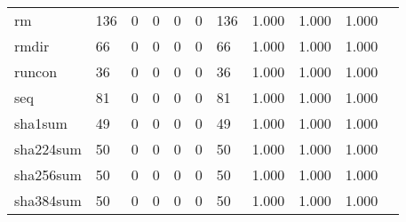 \begin{longtable}{lp{1.10cm}p{1.10cm}p{1.10cm}p{1.10cm}p{1.10cm}p{1.10cm}p{1.10cm}p{1.10cm}p{1.10cm}p{1.10cm}}
rm        &                    136 &                                  0 &                                 0 &                                0 &                                 0 &                             136 &                          1.000 &                                 1.000 &                               1.000 \\
rmdir     &                     66 &                                  0 &                                 0 &                                0 &                                 0 &                              66 &                          1.000 &                                 1.000 &                               1.000 \\
runcon    &                     36 &                                  0 &                                 0 &                                0 &                                 0 &                              36 &                          1.000 &                                 1.000 &                               1.000 \\
seq       &                     81 &                                  0 &                                 0 &                                0 &                                 0 &                              81 &                          1.000 &                                 1.000 &                               1.000 \\
sha1sum   &                     49 &                                  0 &                                 0 &                                0 &                                 0 &                              49 &                          1.000 &                                 1.000 &                               1.000 \\
sha224sum &                     50 &                                  0 &                                 0 &                                0 &                                 0 &                              50 &                          1.000 &                                 1.000 &                               1.000 \\
sha256sum &                     50 &                                  0 &                                 0 &                                0 &                                 0 &                              50 &                          1.000 &                                 1.000 &                               1.000 \\
sha384sum &                     50 &                                  0 &                                 0 &                                0 &                                 0 &                              50 &                          1.000 &                                 1.000 &                               1.000 \\

\end{longtable}
